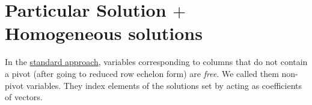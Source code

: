 \vspace{3mm}




\section{Particular Solution $+$ Homogeneous solutions }

In the \hyperlink{standard approach}{standard approach}, variables corresponding to columns that do not contain a pivot (after going to reduced row echelon form) are \emph{free}.  
We called them non-pivot variables. 
They index elements of the solutions set by acting as coefficients of vectors.

